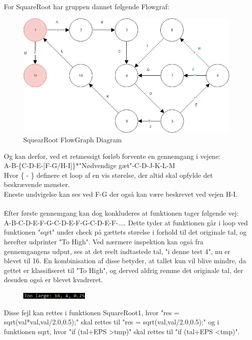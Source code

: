 \documentclass[11pt]{article}
\begin{document}
    \noindent
    For SquareRoot har gruppen dannet følgende Flowgraf:\\
    \begin{figure}[H]
        \centering
        \includegraphics[width=1\textwidth,angle=0]{Struktureret_System_Udvikling/Workshop_3/SquareRoot_FlowGraph.png}
        \caption{SquearRoot FlowGraph Diagram}
        \label{fig:SquearRootGraph}
    \end{figure}
    Og kan derfor, ved et retmessigt forløb forvente en gennemgang i vejene:\\
    A-B-\{C-D-E-[F-G/H-I]\}*"Nødvendige gæt"-C-D-J-K-L-M\\
    Hvor \{ - \} definere et loop af en vis størelse, der altid skal opfylde det beskrævende mønster.\\
    Eneste undvigelse kan ses ved F-G der også kan være beskrevet ved vejen H-I.\\
    \\
    Efter første gennemgang kan dog konkluderes at funktionen tager følgende vej:\\
    A-B-C-D-E-F-G-C-D-E-F-G-C-D-E-F-.... Dette tyder at funktionen går i loop ved funktionen "sqrt" under check på gættets størelse i forhold til det originale tal, og herefter udprinter "To High".
    Ved nærmere inspektion kan også fra gennemgangens udput, ses at det reelt indtastede tal, "i denne test 4", nu er blevet til 16. En kombinisation af disse betyder, at tallet kun vil blive mindre, da gettet er klassifiseret til "To High", og derved aldrig remme det originale tal, der desuden også er blevet kvadreret.
    \begin{figure}[H]
        \includegraphics[width=0.3\textwidth,angle=0]{Struktureret_System_Udvikling/Workshop_3/Udklip.PNG}
        \label{fig:Udklip}
    \end{figure}
    \noindent
    Disse fejl kan rettes i funktionen SquareRoot1, hvor "res = sqrt(val*val,val/2.0,0.5);" skal rettes til "res = sqrt(val,val/2.0,0.5);" og i funktionen sqrt, hvor "if (tal+EPS \textgreater tmp)" skal rettes til "if (tal+EPS \textless tmp)".
    
\end{document}
